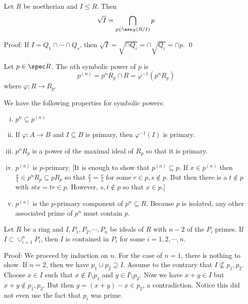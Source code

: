 \begin{prop}
Let $R$ be noetherian and $I \leq R$. Then
\[
\sqrt{I}= \bigcap_{p \in \ass_R(R/I)} p
\]
\end{prop}

\noindent Proof: If $I=Q_1 \cap \cdots \cap Q_s$, then $\sqrt{I}=\sqrt{\cap Q_i}=\cap \sqrt{Q_i}=\cap p$. \qed \\

\begin{dfn}
Let $p \in \spec R$. The $n$th symbolic power of $p$ is 
\[
p^{(n)}=p^nR_p\cap R= \varphi^{-1}(p^nR_p)
\]
where $\varphi: R \to R_p$.
\end{dfn}

\begin{rem} We have the following properties for symbolic powers: 
\begin{enumerate}[(i)]
\item $p^n \subseteq p^{(n)}$
\item If $\varphi: A \to B$ and $I \subseteq B$ is primary, then $\varphi^{-1}(I)$ is primary. 
\item $p^nR_p$ is a power of the maximal ideal of $R_p$ so that it is primary. 
\item $p^{(n)}$ is $p$-primary. [It is enough to show that $p^{(n)} \subseteq p$. If $x \in p^{(n)}$ then $\frac{x}{1} \in p^n R_p \subseteq pR_p$ so that $\frac{x}{1}=\frac{r}{s}$ for some $r \in p, s\notin p$. But then there is a $t \notin p$ with $stx=tr \in p$. However, $s,t \notin p$ so that $x \in p$.]
\item $p^{(n)}$ is the $p$-primary component of $p^n \subseteq R$. Because $p$ is isolated, any other associated prime of $p^n$ must contain $p$.
\end{enumerate}
\end{rem}

\begin{lem}
Let $R$ be a ring and $I,P_1,P_2,\cdots,P_n$ be ideals of $R$ with $n-2$ of the $P_i$ primes. If $I \subset \cup_{i=1}^n P_i$, then $I$ is contained in $P_i$ for some $i=1,2,\cdots,n$. 
\end{lem}

\noindent Proof: We proceed by induction on $n$. For the case of $n=1$, there is nothing to show. If $n=2$, then we have $p_1 \cup p_2 \supseteq I$. Assume to the contrary that $I \not\subseteq p_1,p_2$. Choose $x \in I$ such that $x \notin I \setminus p_1$ and $y \in I \setminus p_2$. Now we have $x+y \in I$ but $x+y \notin p_1,p_2$. But then $y=(x+y)-x \in p_2$, a contradiction. Notice this did not even use the fact that $p_i$ was prime.

